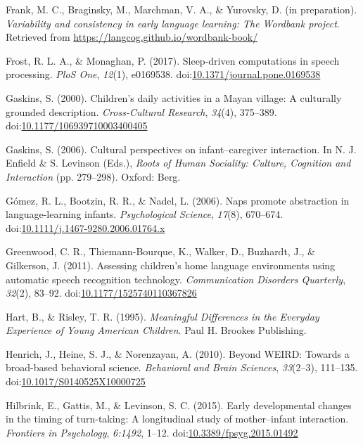 \documentclass[floatsintext,man]{apa6}
\theoremstyle{definition}
\theoremstyle{definition}
\theoremstyle{definition}
\theoremstyle{remark}
\begin{document}
\hypertarget{ref-frankIPvariability}{}
Frank, M. C., Braginsky, M., Marchman, V. A., \& Yurovsky, D. (in
preparation). \emph{Variability and consistency in early language
learning: The Wordbank project}. Retrieved from
\url{https://langcog.github.io/wordbank-book/}

\hypertarget{ref-frost2017sleep}{}
Frost, R. L. A., \& Monaghan, P. (2017). Sleep-driven computations in
speech processing. \emph{PloS One}, \emph{12}(1), e0169538.
doi:\href{https://doi.org/10.1371/journal.pone.0169538}{10.1371/journal.pone.0169538}

\hypertarget{ref-gaskins2000childrens}{}
Gaskins, S. (2000). Children's daily activities in a Mayan village: A
culturally grounded description. \emph{Cross-Cultural Research},
\emph{34}(4), 375--389.
doi:\href{https://doi.org/10.1177/106939710003400405}{10.1177/106939710003400405}

\hypertarget{ref-gaskins2006cultural}{}
Gaskins, S. (2006). Cultural perspectives on infant--caregiver
interaction. In N. J. Enfield \& S. Levinson (Eds.), \emph{Roots of
Human Sociality: Culture, Cognition and Interaction} (pp. 279--298).
Oxford: Berg.

\hypertarget{ref-gomez2006naps}{}
Gómez, R. L., Bootzin, R. R., \& Nadel, L. (2006). Naps promote
abstraction in language-learning infants. \emph{Psychological Science},
\emph{17}(8), 670--674.
doi:\href{https://doi.org/10.1111/j.1467-9280.2006.01764.x}{10.1111/j.1467-9280.2006.01764.x}

\hypertarget{ref-greenwood2011assessing}{}
Greenwood, C. R., Thiemann-Bourque, K., Walker, D., Buzhardt, J., \&
Gilkerson, J. (2011). Assessing children's home language environments
using automatic speech recognition technology. \emph{Communication
Disorders Quarterly}, \emph{32}(2), 83--92.
doi:\href{https://doi.org/10.1177/1525740110367826}{10.1177/1525740110367826}

\hypertarget{ref-hart1995meaningful}{}
Hart, B., \& Risley, T. R. (1995). \emph{Meaningful Differences in the
Everyday Experience of Young American Children}. Paul H. Brookes
Publishing.

\hypertarget{ref-henrich2010beyond}{}
Henrich, J., Heine, S. J., \& Norenzayan, A. (2010). Beyond WEIRD:
Towards a broad-based behavioral science. \emph{Behavioral and Brain
Sciences}, \emph{33}(2--3), 111--135.
doi:\href{https://doi.org/10.1017/S0140525X10000725}{10.1017/S0140525X10000725}

\hypertarget{ref-hilbrink2015early}{}
Hilbrink, E., Gattis, M., \& Levinson, S. C. (2015). Early developmental
changes in the timing of turn-taking: A longitudinal study of
mother--infant interaction. \emph{Frontiers in Psychology},
\emph{6:1492}, 1--12.
doi:\href{https://doi.org/10.3389/fpsyg.2015.01492}{10.3389/fpsyg.2015.01492}
\end{document}
